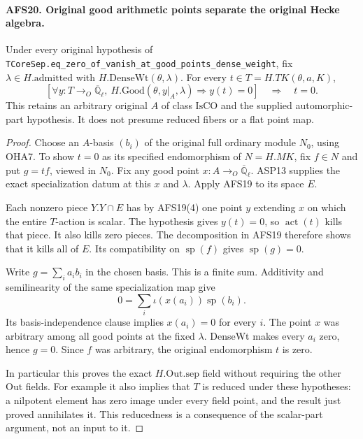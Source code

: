 \documentclass[11pt,a4paper]{article}
\numberwithin{equation}{section}
\theoremstyle{remark}\newtheorem{remark}[theorem]{Remark}
\begin{document}
\paragraph{AFS20. Original good arithmetic points separate the original Hecke algebra.}
\label{claim:AFS20}
Under every original hypothesis of
\texttt{TCore\allowbreak Sep.\allowbreak eq\_\allowbreak zero\_\allowbreak of\_\allowbreak vanish\_\allowbreak at\_\allowbreak good\_\allowbreak points\_\allowbreak dense\_\allowbreak weight},
fix $\lambda\in H.\mathrm{admitted}$ with
$H.\mathrm{DenseWt}(\theta,\lambda)$.  For every $t\in
T=H.TK(\theta,a,K)$,
\[
 \left[
 \forall y:T\to_O\overline{\mathbb Q}_\ell,
 \ H.\mathrm{Good}(\theta,y|_A,\lambda)\Rightarrow y(t)=0
 \right]\quad\Longrightarrow\quad t=0.
\]
This retains an arbitrary original $A$ of class
$\mathrm{IsCO}$ and the supplied automorphic-part hypothesis.
It does not presume
reduced fibers or a flat point map.
\begin{proof}
Choose an $A$-basis $(b_i)$ of the original full ordinary
module $N_0$, using OHA7.  To show $t=0$ as its specified
endomorphism of $N=H.MK$, fix $f\in N$ and put $g=tf$,
viewed in $N_0$.  Fix any good point $x:A\to_O
\overline{\mathbb Q}_\ell$.  ASP13 supplies the exact
specialization datum at this $x$ and $\lambda$.  Apply
AFS19 to its space $E$.

Each nonzero piece $Y.Y\cap E$ has by AFS19(4) one
point $y$ extending $x$ on which the entire $T$-action
is scalar.  The hypothesis gives $y(t)=0$, so
$\operatorname{act}(t)$ kills that piece.  It also kills
zero pieces.  The decomposition in AFS19 therefore
shows that it kills all of $E$.  Its compatibility on
$\operatorname{sp}(f)$ gives $\operatorname{sp}(g)=0$.

Write $g=\sum_i a_i b_i$ in the chosen basis.  This is
a finite sum.  Additivity and semilinearity of the same
specialization map give
\[
             0=\sum_i\iota(x(a_i))\operatorname{sp}(b_i).
\]
Its basis-independence clause implies $x(a_i)=0$ for
every $i$.  The point $x$ was arbitrary among all good
points at the fixed $\lambda$.  DenseWt makes every
$a_i$ zero, hence $g=0$.  Since $f$ was arbitrary,
the original endomorphism $t$ is zero.

In particular this proves the exact $H.\mathrm{Out.sep}$
field without requiring the other $\mathrm{Out}$ fields.
For example it also implies that $T$ is reduced under
these hypotheses: a nilpotent element has zero image
under every field point, and the result just proved
annihilates it.  This reducedness is a consequence of
the scalar-part argument, not an input to it.
\end{proof}
\end{document}
